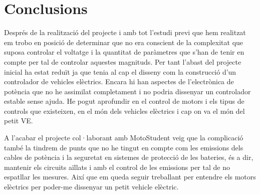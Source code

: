 \chapter{Conclusions}
\label{chap:conclusions}

Després de la realització del projecte i amb tot l'estudi previ que hem realitzat em trobo en posició de determinar que no era conscient de la complexitat que suposa controlar el voltatge i la quantitat de paràmetres que s'han de tenir en compte per tal de controlar aquestes magnituds. Per tant l'abast del projecte inicial ha estat reduït ja que tenia al cap el disseny com la construcció d'un controlador de vehicles elèctrics. Encara hi han aspectes de l'electrònica de potència que no he assimilat completament i no podria dissenyar un controlador estable sense ajuda. He pogut aprofundir en el control de motors i els tipus de controls que existeixen, en el món dels vehicles elèctrics i cap on va el món del petit VE.

A l'acabar el projecte col·laborant amb MotoStudent veig que la complicació també la tindrem de punts que no he tingut en compte com les emissions dels cables de potència i la seguretat en sistemes de protecció de les bateries, és a dir, mantenir els circuits aïllats i amb el control de les emissions per tal de no espatllar les mesures. Així que em queda seguir treballant per entendre els motors elèctrics per poder-me dissenyar un petit vehicle elèctric.
